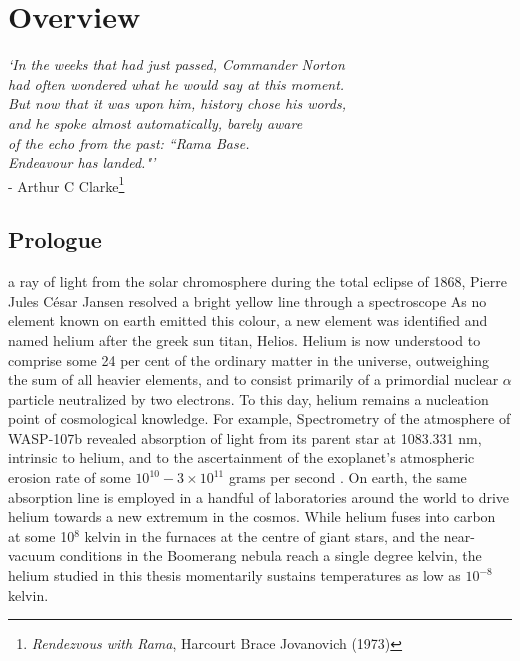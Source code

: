 


\chapter*{Overview}

\setcounter{page}{0}
\begin{adjustwidth}{3cm}{0cm}
\begin{flushright}
{\emph{`In the weeks that had just passed, Commander Norton\\
had often wondered what he would say at this moment.\\
But now that it was upon him, history chose his words,\\
and he spoke almost	automatically, 	barely aware \\
of the echo from the past: ``Rama Base.\\
 \emph{Endeavour} has landed."'}\\ 
- Arthur C Clarke\footnote{\emph{Rendezvous with Rama}, Harcourt Brace Jovanovich (1973)}}
\end{flushright}
\end{adjustwidth}

\section*{Prologue}\label{sec:prologue}


	 a ray of light from the solar chromosphere during the total eclipse of 1868, Pierre Jules C\'{e}sar Jansen resolved a bright yellow line through a spectroscope
	As no element known on earth emitted this colour, a new element was identified and named helium after the greek sun titan, Helios. Helium is now understood to comprise some 24 per cent of the ordinary matter in the universe, outweighing the sum of all heavier elements, and to consist primarily of a primordial nuclear $\alpha$ particle neutralized by two electrons. To this day, helium remains a nucleation point of cosmological knowledge. For example, Spectrometry of the atmosphere of WASP-107b revealed absorption of light from its parent star at 1083.331 nm, intrinsic to helium, and to the ascertainment of the exoplanet's atmospheric erosion rate of some $10^{10}-3\times10^{11}$ grams per second \cite{Spake18}. On earth, the same absorption line is employed in a handful of laboratories around the world to drive helium towards a new extremum in the cosmos. While helium fuses into carbon at some 10$^8$ kelvin in the furnaces at the centre of giant stars, and the near-vacuum conditions in the Boomerang nebula reach a single degree kelvin, the helium studied in this thesis momentarily sustains temperatures as low as $10^{-8}$ kelvin.


